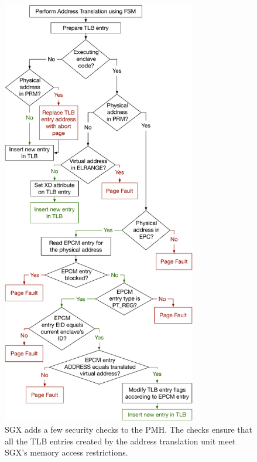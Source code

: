 \begin{figure}[hbtp]
  \centering
  \includegraphics[width=85mm]{figures/sgx_tlb_miss_checks.pdf}
  \caption{
    SGX adds a few security checks to the PMH. The checks ensure that all the
    TLB entries created by the address translation unit meet SGX's memory
    access restrictions.
  }
  \label{fig:sgx_tlb_miss_checks}
\end{figure}


